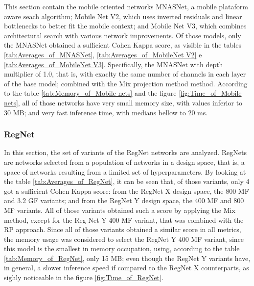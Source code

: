 





\pagebreak

This section contain the mobile oriented networks MNASNet, a mobile plataform aware seach algorithm; Mobile Net V2, which uses inverted residuals and linear bottlenecks to better fit the mobile context; and Mobile Net V3, which combines architectural search with various network improvements. Of those models, only the MNASNet obtained a sufficient Cohen Kappa score, as visible in the tables \ref{tab:Averages_of_MNASNet}, \ref{tab:Averages_of_MobileNet V2} e \ref{tab:Averages_of_MobileNet V3}. Specifically, the MNASNet with depth multiplier of 1.0, that is, with exaclty the same number of channels in each layer of the base model; combined with the \acrshort{Mix} projection method method. According to the table \ref{tab:Memory_of_Mobile nets} and the figure \ref{fig:Time_of_Mobile nets}, all of those networks have very small memory size, with values inferior to 30 MB; and very fast inference time, with medians bellow to 20 ms.  

\pagebreak

\subsubsection{RegNet}







In this section, the set of variants of the RegNet networks are analyzed. RegNets are networks selected from a population of networks in a design space, that is, a space of networks resulting from a limited set of hyperparameters. By looking at the table \ref{tab:Averages_of_RegNet}, it can be seen that, of those variants, only 4 got a sufficient Cohen Kappa score: from the RegNet X design space, the 800 MF and 3.2 GF variants; and from the RegNet Y design space, the 400 MF and 800 MF variants. All of those variants obtained such a score by applying the \acrshort{Mix} method, except for the Reg Net Y 400 MF variant, that was combined with the \acrshort{RP} approach. Since all of those variants obtained a similar score in all metrics, the memory usage was considered to select the RegNet Y 400 MF variant, since this model is the smallest in memory occupation, using, according to the table \ref{tab:Memory_of_RegNet}, only 15 MB; even though the RegNet Y variants have, in general, a slower inference speed if compared to the RegNet X counterparts, as sighly noticeable in the figure \ref{fig:Time_of_RegNet}.


